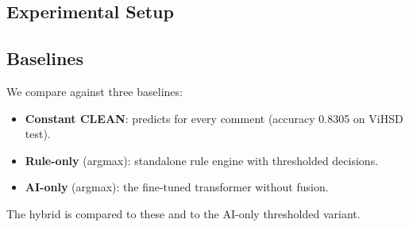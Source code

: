 \subsection{Experimental Setup}


\subsection{Baselines}
\label{sec:baselines}
We compare against three baselines:
\begin{itemize}
    \item \textbf{Constant CLEAN}: predicts \clean{} for every comment
          (accuracy 0.8305 on ViHSD test).
    \item \textbf{Rule-only} (argmax): standalone rule engine with thresholded
          decisions.
    \item \textbf{AI-only} (argmax): the fine-tuned transformer without fusion.
\end{itemize}
The hybrid is compared to these and to the AI-only thresholded variant.